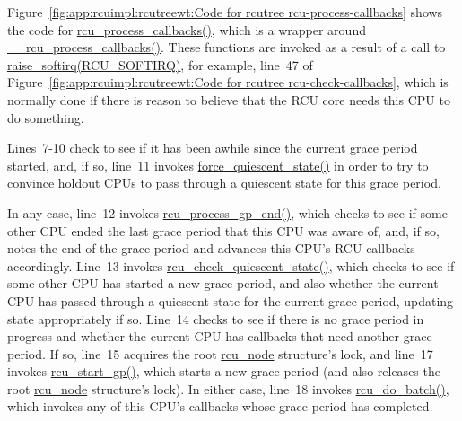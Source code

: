 Figure~\ref{fig:app:rcuimpl:rcutreewt:Code for rcutree rcu-process-callbacks}
shows the code for \url{rcu_process_callbacks()}, which is a wrapper around
\url{__rcu_process_callbacks()}.
These functions are invoked as a result of a call to
\url{raise_softirq(RCU_SOFTIRQ)}, for example, line~47 of
Figure~\ref{fig:app:rcuimpl:rcutreewt:Code for rcutree rcu-check-callbacks},
which is normally done if there is reason to believe that the RCU core
needs this CPU to do something.

Lines~7-10 check to see if it has been awhile since the current grace
period started, and, if so, line~11 invokes \url{force_quiescent_state()}
in order to try to convince holdout CPUs to pass through a quiescent
state for this grace period.

 \QuickQuizEnd

In any case, line~12 invokes \url{rcu_process_gp_end()}, which checks to
see if some other CPU ended the
last grace period that this CPU was aware of, and, if so, notes the
end of the grace period and advances this CPU's RCU callbacks
accordingly.
Line~13 invokes \url{rcu_check_quiescent_state()}, which checks to
see if some other CPU has started a new grace period, and also whether
the current CPU has passed through a quiescent state for the current
grace period, updating state appropriately if so.
Line~14 checks to see if there is no grace period in progress and whether
the current CPU has callbacks that need another grace period.
If so, line~15 acquires the root \url{rcu_node} structure's lock,
and line~17 invokes \url{rcu_start_gp()}, which starts a new grace
period (and also releases the root \url{rcu_node} structure's lock).
In either case, line~18 invokes \url{rcu_do_batch()}, which
invokes any of this CPU's callbacks whose grace period has completed.

 \QuickQuizEnd

